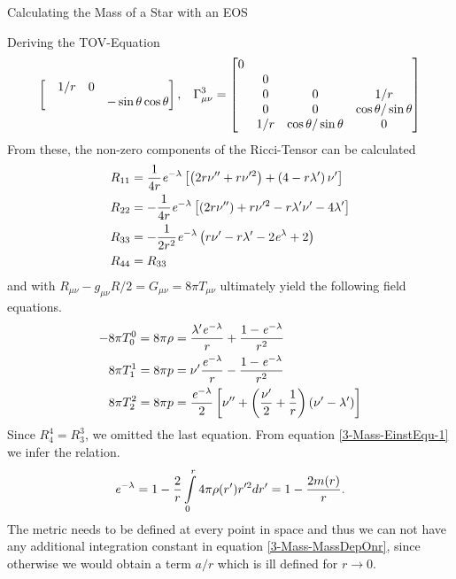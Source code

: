 \begin{section}{Calculating the Mass of a Star with an EOS}
\begin{subsection}{Deriving the TOV-Equation}
\begin{align}
\begin{bmatrix}
	                     	& 1/r & 0 &\\
	                     	& & & -\sin\theta\cos\theta
	                     \end{bmatrix}, \hspace{0.3cm}
	\Gamma_{\mu\nu}^3 = \begin{bmatrix}
	                     	0 & & &\\
	                     	& 0 & &\\
	                     	& 0 & 0 & 1/r\\
	                     	& 0 & 0 & \cos\theta/\sin\theta\\
	                     	& 1/r & \cos\theta/\sin\theta & 0
						\end{bmatrix}
\end{align}
From these, the non-zero components of the Ricci-Tensor can be calculated 
\begin{align}
	R_{11} &= \frac{1}{4r}\mathit{e}^{-\lambda}\left[\left(2r\nu''+r\nu'^2\right) + \left(4-r\lambda'\right)\nu'\right]\\
	R_{22} &= -\frac{1}{4r}\mathit{e}^{-\lambda}\left[\left(2r\nu''\right)+r\nu'^2-r\lambda'\nu'-4\lambda'\right]\\
	R_{33} &= -\frac{1}{2r^2}\mathit{e}^{-\lambda}\left(r\nu'-r\lambda'-2\mathit{e}^\lambda+2\right)\\
	R_{44} &= R_{33}
\end{align}
and with $R_{\mu\nu}-g_{\mu\nu}R/2=G_{\mu\nu}=8\pi T_{\mu\nu}$ ultimately yield the following field equations.
\begin{align}
	-8\pi T_0^0 = 8\pi\rho &= \frac{\lambda'\mathit{e}^{-\lambda}}{r}+\frac{1-\mathit{e}^{-\lambda}}{r^2}\label{3-Mass-EinstEqu-1}\\
	8\pi T_1^1 = 8\pi p &= \nu'\frac{\mathit{e}^{-\lambda}}{r} - \frac{1-\mathit{e}^{-\lambda}}{r^2}\label{3-Mass-EinstEqu-2}\\
	8\pi T_2^2 = 8\pi p &= \frac{\mathit{e}^{-\lambda}}{2}\left[\nu''+\left(\frac{\nu'}{2} + \frac{1}{r}\right)\left(\nu'-\lambda'\right) \right]\label{3-Mass-EinstEqu-3}
\end{align}
Since $R_4^4=R_3^3$, we omitted the last equation. From equation \eqref{3-Mass-EinstEqu-1} we infer the relation.
\begin{equation}
	\mathit{e}^{-\lambda} = 1 - \frac{2}{r}\int\limits_0^r 4\pi\rho(r') r'^2dr' = 1 - \frac{2m(r)}{r}.
	\label{3-Mass-MassDepOnr}
\end{equation}
The metric needs to be defined at every point in space and thus we can not have any additional integration constant in equation \eqref{3-Mass-MassDepOnr}, since otherwise we would obtain a term $a/r$ which is ill defined for $r\rightarrow0$.\\

\end{subsection}
\end{section}
